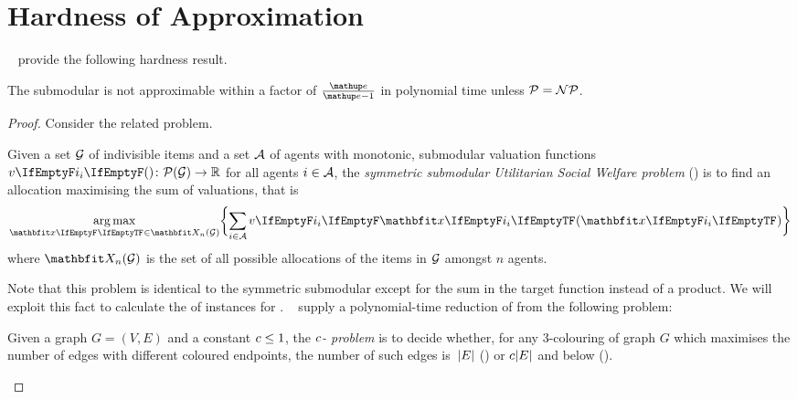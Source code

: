 \section{Hardness of Approximation}
\label{sec:hardness}

~\cite[Sction 4]{APNSWuSVþUM} provide the following hardness result.
\begin{theorem}
	The submodular \NSW{} is not approximable within a factor of \(\frac{\euler}{\euler - 1}\) in polynomial time unless \(\mathcal{P} = \mathcal{NP}\).
\end{theorem}
\begin{proof}
	Consider the related \SW{} problem\footnotemark.
	\begin{problem}
		\label{prob:sw}
		Given a set \(\mathcal{G}\) of indivisible items and a set \(\mathcal{A}\) of agents with monotonic, submodular valuation functions \(\valuations \colon \powerset[\goods] \to \real\) for all agents \(i \in \mathcal{A}\), the \emph{symmetric submodular Utilitarian Social Welfare problem} (\SW) is to find an allocation maximising the sum of valuations, that is
		\begin{equation*}
			\argmax_{\alloc[][] \in \allallocs{n}{\goods}} \braces[\bigg]{ \smashoperator{\sum_{i \in \agents}} \valuations[\alloc] }
		\end{equation*}
		where \(\allallocs{n}{\goods}\) is the set of all possible allocations of the items in \(\mathcal{G}\) amongst \(n\) agents.
	\end{problem}

	Note that this problem is identical to the symmetric submodular \NSW{} except for the sum in the target function instead of a product.
	We will exploit this fact to calculate the \NSW{} of instances for \SW.
	\citeauthor{inapproximability}~\cite{inapproximability} supply a polynomial-time reduction of \SW{} from the following problem:
	\begin{problem}
		Given a graph \(G = (V, E)\) and a constant \(c \le 1\), the \emph{\(c\)-\Gap{} problem} is to decide whether, for any 3-colouring of graph \(G\) which maximises the number of edges with different coloured endpoints, the number of such edges is~\(\vert E\vert\) (\emph{\Yes}) or \(c \vert E\vert\) and below (\emph{\No}).
	\end{problem}


\end{proof}
